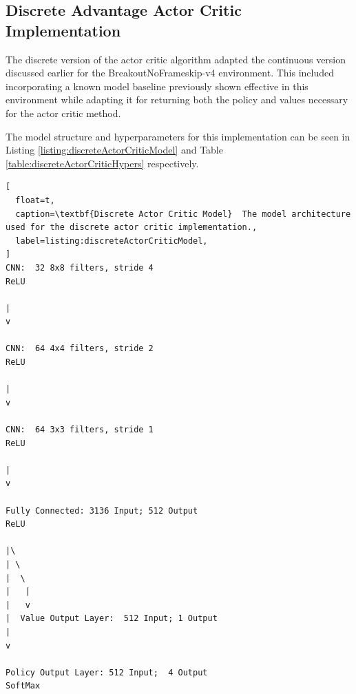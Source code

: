 \documentclass[conference]{IEEEtran}
\begin{document}
\subsection{Discrete Advantage Actor Critic Implementation}
The discrete version of the actor critic algorithm adapted the continuous version discussed earlier for the BreakoutNoFrameskip-v4 environment.
This included incorporating a known model baseline previously shown effective in this environment while adapting it for returning both the policy and values necessary for the actor critic method.

The model structure and hyperparameters for this implementation can be seen in Listing \ref{listing:discreteActorCriticModel} and Table \ref{table:discreteActorCriticHypers} respectively.

\begin{lstlisting}[
  float=t,
  caption=\textbf{Discrete Actor Critic Model}  The model architecture used for the discrete actor critic implementation.,
  label=listing:discreteActorCriticModel,
]
CNN:  32 8x8 filters, stride 4
ReLU

|
v

CNN:  64 4x4 filters, stride 2
ReLU

|
v

CNN:  64 3x3 filters, stride 1
ReLU

|
v

Fully Connected: 3136 Input; 512 Output
ReLU

|\
| \
|  \
|   |
|   v
|  Value Output Layer:  512 Input; 1 Output
|
v

Policy Output Layer: 512 Input;  4 Output
SoftMax
\end{lstlisting}
\end{document}
